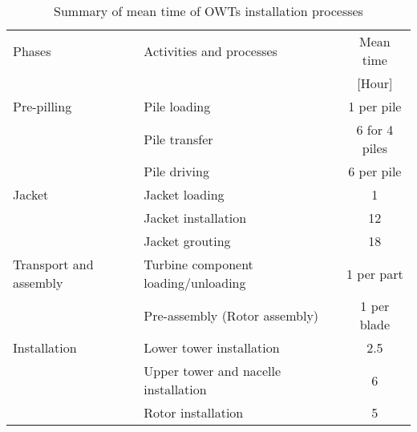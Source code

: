 
\begin{table}
\label{tab:times}

\begin{tabular}{llc}
\hline 
Phases & Activities and processes & Mean time \\ 
& & [Hour] \\ 
\hline 
Pre-pilling & Pile loading & 1 per pile \\
 & Pile transfer & 6 for 4 piles\\
 & Pile driving & 6 per pile\\
\hline
Jacket & Jacket loading & 1\\
 & Jacket installation & 12\\
 & Jacket grouting & 18\\
\hline
Transport and assembly & Turbine component loading/unloading & 1 per part\\
 & Pre-assembly (Rotor assembly) & 1 per blade  \\
\hline
Installation & Lower tower installation & 2.5\\
 & Upper tower and nacelle installation & 6\\
 & Rotor installation & 5\\
\hline 
\end{tabular} 

\caption{Summary of mean time of OWTs installation processes}
\end{table}
